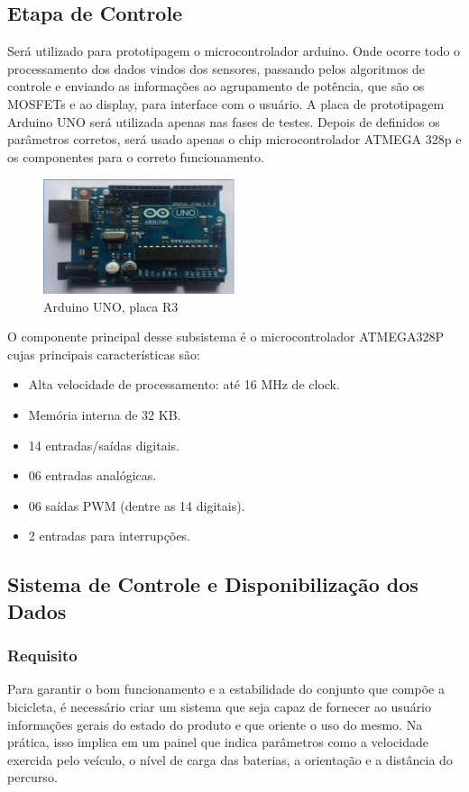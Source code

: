 	\subsection{Etapa de Controle}
	Será utilizado para prototipagem o microcontrolador arduino. Onde ocorre todo o processamento dos dados vindos dos sensores, passando pelos algoritmos de controle e enviando as informações ao agrupamento de potência, que são os MOSFETs e ao display, para interface com o usuário. A placa de prototipagem Arduino UNO será utilizada apenas nas fases de testes. Depois de definidos os parâmetros corretos, será usado apenas o chip microcontrolador ATMEGA 328p e os componentes para o correto funcionamento.
		
			\graphicspath{{figuras/}}
			\begin{figure}[h!]
				\centering
				\includegraphics[width=0.5\textwidth]{Figura5_Arduino_Uno.PNG}
				\caption{Arduino UNO, placa R3}
				\label{img:Arduino_Uno}
			\end{figure}
		
	O componente principal desse subsistema é o microcontrolador ATMEGA328P cujas principais características são:
		
	\begin{itemize}
			\item  Alta velocidade de processamento: até 16 MHz de clock.
			\item Memória interna de 32 KB.
			\item 14 entradas/saídas digitais.
			\item 06 entradas analógicas.
			\item  06 saídas PWM (dentre as 14 digitais).
			\item 2 entradas para interrupções.
		\end{itemize}
	
  
 	\subsection{Sistema de Controle e Disponibilização dos Dados}
 		\subsubsection{Requisito}
 		Para garantir o bom funcionamento e a estabilidade do conjunto que compõe a bicicleta, é necessário criar um sistema que seja capaz de fornecer ao usuário informações gerais do estado do produto e que oriente o uso do mesmo. Na prática, isso implica em um painel que indica parâmetros como a velocidade exercida pelo veículo, o nível de carga das baterias, a orientação e a distância do percurso.
 		
